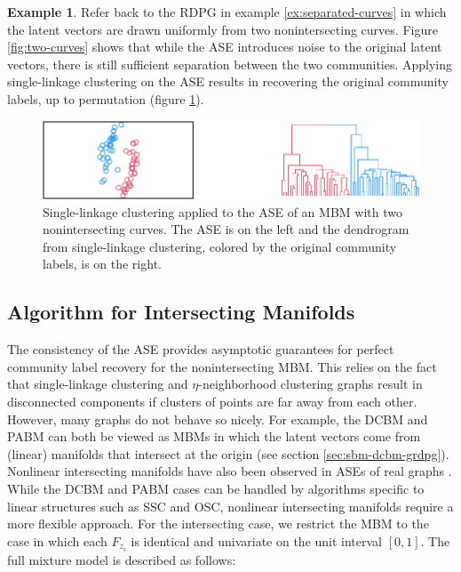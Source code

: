 \documentclass[
  12pt,
]{article}
\theoremstyle{definition}
\theoremstyle{definition}
\newtheorem{example}{Example}[section]
\theoremstyle{definition}
\theoremstyle{definition}
\theoremstyle{remark}
\begin{document}
\begin{example}
\label{ex:separated-curves-2}
Refer back to the RDPG in example \ref{ex:separated-curves} in which the latent vectors are drawn uniformly from two nonintersecting curves. 
Figure \ref{fig:two-curves} shows that while the ASE introduces noise to the original latent vectors, there is still sufficient separation between the two communities. 
Applying single-linkage clustering on the ASE results in recovering the original community labels, up to permutation (figure \ref{fig:two-curves-2}). 

\begin{figure}[H]

{\centering \includegraphics{draft_files/figure-latex/two-curves-2-1} 

}

\caption{Single-linkage clustering applied to the ASE of an MBM with two nonintersecting curves. The ASE is on the left and the dendrogram from single-linkage clustering, colored by the original community labels, is on the right.}\label{fig:two-curves-2}
\end{figure}
\end{example}

\hypertarget{sec:intersect}{%
\subsection{Algorithm for Intersecting Manifolds}\label{sec:intersect}}

The consistency of the ASE provides asymptotic guarantees for perfect community label recovery for the nonintersecting MBM.
This relies on the fact that single-linkage clustering and \(\eta\)-neighborhood clustering graphs result in disconnected components if clusters of points are far away from each other.
However, many graphs do not behave so nicely.
For example, the DCBM and PABM can both be viewed as MBMs in which the latent vectors come from (linear) manifolds that intersect at the origin (see section \ref{sec:sbm-dcbm-grdpg}).
Nonlinear intersecting manifolds have also been observed in ASEs of real graphs \citep{SannaPassino2022, https://doi.org/10.48550/arxiv.1709.05454}.
While the DCBM and PABM cases can be handled by algorithms specific to linear structures such as SSC and OSC, nonlinear intersecting manifolds require a more flexible approach.
For the intersecting case, we restrict the MBM to the case in which each \(F_{z_i}\) is identical and univariate on the unit interval \([0, 1]\).
The full mixture model is described as follows:
\end{document}

